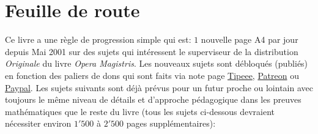 	\section{Feuille de route}
	Ce livre a une règle de progression simple qui est: $1$ nouvelle page A4 par jour depuis Mai 2001 sur des sujets qui int\'eressent le superviseur de la distribution \textit{Originale} du livre \textit{Opera Magistris}. Les nouveaux sujets sont d\'ebloqu\'es (publi\'es) en fonction des paliers de dons qui sont faits via note page \href{https://www.tipeee.com/elements-of-applied-mathematics}{Tipeee}, \href{https://www.patreon.com/sciences}{Patreon} ou \href{https://www.paypal.me/scientificevolution}{Paypal}. Les sujets suivants sont d\'ejà pr\'evus pour un futur proche ou lointain avec toujours le même niveau de d\'etails et d'approche p\'edagogique dans les preuves math\'ematiques que le reste du livre (tous les sujets ci-dessous devraient n\'ecessiter environ $1'500$ à $2'500$ pages suppl\'ementaires):

